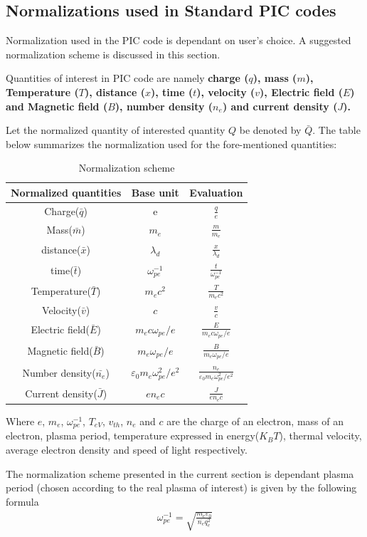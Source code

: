 \documentclass{article}
\begin{document}
\subsection*{Normalizations used in Standard PIC codes}

Normalization used in the PIC code is dependant on user's choice. A suggested normalization scheme is discussed in this section\cite{8,10}.

Quantities of interest in PIC code are namely \textbf{charge ($q$), mass ($m$), Temperature ($T$), distance ($x$), time ($t$), velocity ($v$), Electric field ($E$) and Magnetic field ($B$), number density ($n_{e}$) and current density ($J$).}

Let the normalized quantity of interested quantity $Q$ be denoted by $\bar{Q}$. The table below summarizes the normalization used for the fore-mentioned quantities:

\begin{table}[!htb]
\setlength{\tabcolsep}{0.8em} %
{\renewcommand{\arraystretch}{1.8}%
\begin{tabular}{|c|c|c|}
\hline 
Normalized quantities & Base unit & Evaluation\tabularnewline
\hline 
Charge($\bar{q}$) & e & $\frac{q}{e}$\tabularnewline
Mass($\bar{m}$) & $m_{e}$ &$\frac{m}{m_{e}}$\tabularnewline
distance($\bar{x}$) & $\lambda_{d}$ &$\frac{x}{\lambda_{d}}$\tabularnewline
time($\bar{t}$) & $\omega_{pe}^{-1}$ &$\frac{t}{\omega_{pe}^{-1}}$\tabularnewline
Temperature($\bar{T}$) & $m_{e}c^{2}$ &$\frac{T}{m_{e}c^{2}}$\tabularnewline
Velocity($\bar{v}$) & $c$ &$\frac{v}{c}$\tabularnewline
Electric field($\bar{E}$) & $m_{e}c\omega_{pe}/e$ &$\frac{E}{m_{e}c\omega_{pe}/e}$\tabularnewline
Magnetic field($\bar{B}$) & $m_{e}\omega_{pe}/e$ &$\frac{B}{m_{e}\omega_{pe}/e}$\tabularnewline
Number density($\bar{n_{e}}$) & $\varepsilon_{0}m_{e}\omega_{pe}^{2}/e^{2}$ &$\frac{n_{e}}{\varepsilon_{0}m_{e}\omega_{pe}^{2}/e^{2}}$\tabularnewline
Current density($\bar{J}$) & $en_{e}c$ & $\frac{J}{en_{e}c}$\tabularnewline
\hline 
\end{tabular}
}
\caption{Normalization scheme}
\label{table1}
\end{table}

Where $e$, $m_{e}$, $\omega_{pe}^{-1}$, $T_{eV}$, $v_{th}$, $n_{e}$ and $c$ are the charge of an electron, mass of an electron, plasma period, temperature expressed in energy($K_{B}T$), thermal velocity, average electron density and speed of light respectively. 

The normalization scheme presented in the current section is dependant plasma period (chosen according to the real plasma of interest) is given by the following formula
\begin{align}
\omega_{pe}^{-1} = \sqrt{\frac{m_{e} \varepsilon_{0} }{ \bar{ n_{e}}q_{e}^{2}} }
\end{align}
\end{document}
